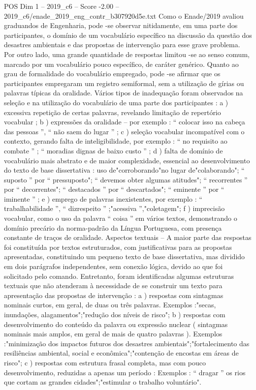 \begin{textsample}{POS Dim 1 – 2019\_c6 – Score -2.00 – 2019\_c6/enade\_2019\_eng\_contr\_b307920d5e.txt}
Como o Enade/2019 avaliou graduandos de Engenharia, pode -se observar nitidamente, em uma parte dos participantes, o domínio de um vocabulário específico na discussão da questão dos desastres ambientais e das propostas de intervenção para esse grave problema.
Por outro lado, uma grande quantidade de respostas limitou -se ao senso comum, marcado por um vocabulário pouco específico, de caráter genérico.
Quanto ao grau de formalidade do vocabulário empregado, pode -se afirmar que os participantes empregaram um registro semiformal, sem a utilização de gírias ou palavras típicas da oralidade.
Vários tipos de inadequação foram observados na seleção e na utilização do vocabulário de uma parte dos participantes : a ) excessiva repetição de certas palavras, revelando limitação de repertório vocabular ; b ) expressões da oralidade – por exemplo : “ colocar isso na cabeça das pessoas ”, “ não saem do lugar ” ; c ) seleção vocabular incompatível com o contexto, gerando falta de inteligibilidade, por exemplo : “ no requisito ao combate ” ; “ moradias dignas de baixo custo ” ; d ) falta de domínio de vocabulário mais abstrato e de maior complexidade, essencial ao desenvolvimento do texto de base dissertativa : uso de"corroborando"no lugar de"colaborando"; “ suposto ” por “ pressuposto"; “ devemos obter algumas atitudes"; “ recorrentes ” por “ decorrentes"; “ destacados ” por “ descartados"; “ eminente ” por “ iminente ” ; e ) emprego de palavras inexistentes, por exemplo : “ trabalhabilidade ”, “ dizrespeito ” ;"acessiva ”,"coletagem"; f ) imprecisão vocabular, como o uso da palavra “ coisa ” em vários textos, demonstrando o domínio precário da norma-padrão da Língua Portuguesa, com presença constante de traços de oralidade.
Aspectos textuais – A maior parte das respostas foi constituída por textos estruturados, com justificativas para as propostas apresentadas, constituindo um pequeno texto de base dissertativa, mas dividido em dois parágrafos independentes, sem conexão lógica, devido ao que foi solicitado pelo comando.
Entretanto, foram identificadas algumas estruturas textuais que não atenderam à necessidade de se construir um texto para apresentação das propostas de intervenção : a ) respostas com sintagmas nominais curtos, em geral, de duas ou três palavras.
Exemplos :"secas, inundações, alagamentos";"redução dos níveis de risco"; b ) respostas com desenvolvimento do conteúdo da palavra ou expressão nuclear ( sintagmas nominais mais amplos, em geral de mais de quatro palavras ).
Exemplos :"minimização dos impactos futuros dos desastres ambientais";"fortalecimento das resiliências ambiental, social e econômica";"contenção de encostas em áreas de risco"; c ) respostas com estrutura frasal completa, mas com pouco desenvolvimento, reduzidas a apenas um período : Exemplos : “ dragar ” os rios que cortam as grandes cidades";"estimular o trabalho voluntário".

\end{textsample}
